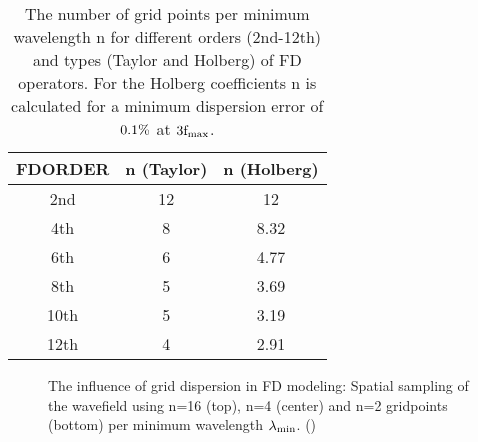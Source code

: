 \begin{table}[hbt]
\begin{center}
\begin{tabular}{ccc}\hline \hline
FDORDER & n (Taylor) & n (Holberg) \\ \hline 
2nd   &   12       &  12         \\
4th   &   8        &  8.32       \\
6th   &   6        &  4.77       \\
8th   &   5        &  3.69       \\ 
10th  &   5        &  3.19       \\
12th  &   4        &  2.91       \\
\hline \hline
\end{tabular}
\caption{\label{grid_disp.2} The number of grid points per minimum wavelength n for different orders (2nd-12th) and types (Taylor and
Holberg) of FD operators. For the Holberg coefficients n is calculated for a minimum dispersion error of $\rm{0.1\%}$ at $\rm{3 f_{max}}$.}
\end{center}
\end{table} 
\clearpage
\begin{figure}[ht]
\begin{center}
\caption{\label{grid_disp_pics} The influence of grid dispersion in FD modeling: Spatial sampling of the wavefield using n=16 (top), n=4 (center) and n=2 gridpoints (bottom) per minimum wavelength $\rm{\lambda_{min}}$. (\cite{koehn:11})}
\end{center}
\end{figure}
\clearpage
